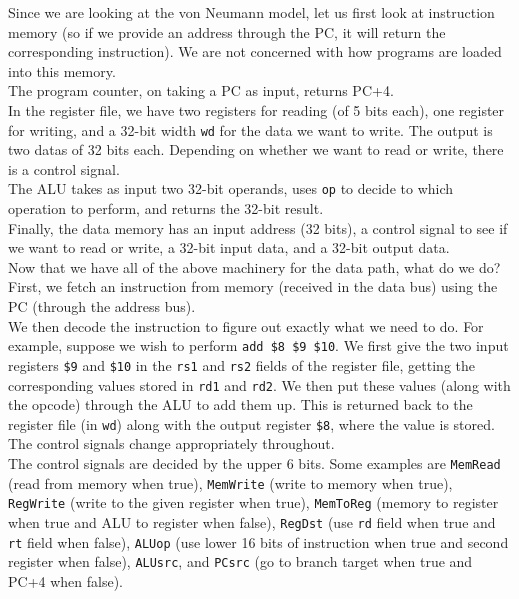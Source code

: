 \documentclass{article}
\begin{document}
		Since we are looking at the von Neumann model, let us first look at instruction memory (so if we provide an address through the PC, it will return the corresponding instruction). We are not concerned with how programs are loaded into this memory.\\
		The program counter, on taking a PC as input, returns PC+4.\\
		In the register file, we have two registers for reading (of 5 bits each), one register for writing, and a 32-bit width \texttt{wd} for the data we want to write. The output is two datas of 32 bits each. Depending on whether we want to read or write, there is a control signal.\\
		The ALU takes as input two 32-bit operands, uses \texttt{op} to decide to which operation to perform, and returns the 32-bit result.\\
		Finally, the data memory has an input address (32 bits), a control signal to see if we want to read or write, a 32-bit input data, and a 32-bit output data.\\

		Now that we have all of the above machinery for the data path, what do we do?\\
		First, we fetch an instruction from memory (received in the data bus) using the PC (through the address bus).\\
		We then decode the instruction to figure out exactly what we need to do. For example, suppose we wish to perform \texttt{add \$8 \$9 \$10}. We first give the two input registers \texttt{\$9} and \texttt{\$10} in the \texttt{rs1} and \texttt{rs2} fields of the register file, getting the corresponding values stored in \texttt{rd1} and \texttt{rd2}. We then put these values (along with the opcode) through the ALU to add them up. This is returned back to the register file (in \texttt{wd}) along with the output register \texttt{\$8}, where the value is stored. The control signals change appropriately throughout.\\

		The control signals are decided by the upper 6 bits. Some examples are \texttt{MemRead} (read from memory when true), \texttt{MemWrite} (write to memory when true), \texttt{RegWrite} (write to the given register when true), \texttt{MemToReg} (memory to register when true and ALU to register when false), \texttt{RegDst} (use \texttt{rd} field when true and \texttt{rt} field when false), \texttt{ALUop} (use lower 16 bits of instruction when true and second register when false), \texttt{ALUsrc}, and \texttt{PCsrc} (go to branch target when true and PC+4 when false).\\
\end{document}
